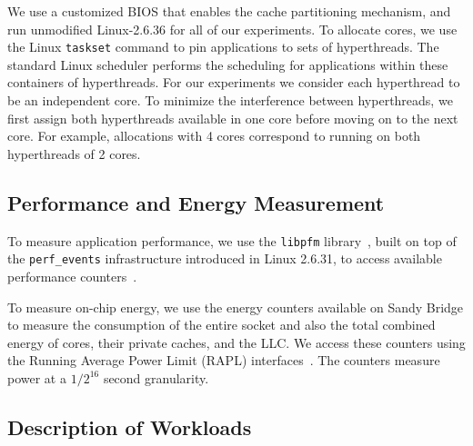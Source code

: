 
We use a customized BIOS that enables the cache partitioning
mechanism, and run unmodified Linux-2.6.36 for all of our experiments.
To allocate cores, we use the Linux {\tt taskset} command to pin applications to
sets of hyperthreads. The standard Linux scheduler performs the scheduling for applications within these containers of hyperthreads. For our experiments we consider each hyperthread to be an independent core. To minimize the interference between hyperthreads, we first assign both hyperthreads available in one core before moving on to the next core. For example, allocations with 4 cores correspond to running on both hyperthreads of 2 cores.

\subsection{Performance and Energy Measurement}

To measure application performance, we use the \texttt{libpfm}
library~\cite{Eranian:OLS06,Perfmon2}, built on top of the
\texttt{perf\_events} infrastructure introduced in Linux 2.6.31, to
access available performance counters~\cite{Intel:Manual2012}.

To measure on-chip energy, we use the energy counters available on
Sandy Bridge to measure the consumption of  the entire socket and also
the total combined energy of cores, their private caches, and the
LLC. We access these counters using the Running Average Power Limit
(RAPL) interfaces~\cite{Intel:Manual2012}.  The counters measure power
at a $1/2^{16}$ second granularity.


\subsection{Description of Workloads}

